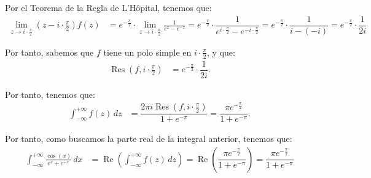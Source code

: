 \documentclass[12pt]{article}
\renewcommand{\Re}{\operatorname{Re}} %
\DeclareMathOperator{\Res}{Res}
\begin{document}
\begin{ejercicio}[2.5 puntos]
    Por el Teorema de la Regla de L'Hôpital, tenemos que:
    \begin{align*}
        \lim_{z\to i\cdot \frac{\pi}{2}} \left(z - i\cdot \frac{\pi}{2}\right)f(z) &= e^{-\frac{\pi}{2}}\cdot \lim_{z\to i\cdot \frac{\pi}{2}} \frac{1}{e^z - e^{-z}}
        = e^{-\frac{\pi}{2}}\cdot \dfrac{1}{e^{i\cdot \frac{\pi}{2}} - e^{-i\cdot \frac{\pi}{2}}}
        = e^{-\frac{\pi}{2}}\cdot \dfrac{1}{i - (-i)} = e^{-\frac{\pi}{2}}\cdot \dfrac{1}{2i}
    \end{align*}

    Por tanto, sabemos que $f$ tiene un polo simple en $i\cdot \frac{\pi}{2}$, y que:
    \begin{align*}
        \Res\left(f, i\cdot \frac{\pi}{2}\right) &= e^{-\frac{\pi}{2}}\cdot \dfrac{1}{2i}.
    \end{align*}

    Por tanto, tenemos que:
    \begin{align*}
        \int_{-\infty}^{+\infty} f(z) \, dz &= \dfrac{2\pi i\Res\left(f, i\cdot \frac{\pi}{2}\right)}{1 + e^{-\pi}}
        = \dfrac{\pi e^{-\frac{\pi}{2}}}{1 + e^{-\pi}}.
    \end{align*}

    Por tanto, como buscamos la parte real de la integral anterior, tenemos que:
    \begin{align*}
        \int_{-\infty}^{+\infty} \frac{\cos(x)}{e^x + e^{-x}} \, dx &= \Re\left(\int_{-\infty}^{+\infty} f(z) \, dz\right) = \Re\left(\dfrac{\pi e^{-\frac{\pi}{2}}}{1 + e^{-\pi}}\right)
        = \dfrac{\pi e^{-\frac{\pi}{2}}}{1 + e^{-\pi}}
    \end{align*}
    \end{ejercicio}
\end{document}
